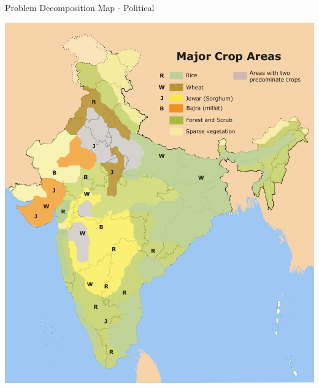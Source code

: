\documentclass{beamer}
\begin{document}
\begin{frame}[fragile]{Problem Decomposition}
{Map - Political}

\begin{center}
\includegraphics[height=0.75\textheight]{images/1200px-Major_crop_areas_India.png}
\end{center}
\end{frame}
\end{document}
